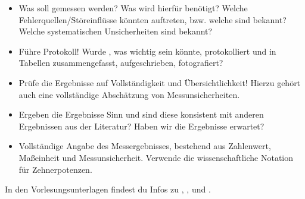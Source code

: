 \documentclass[letterpaper,10pt,english]{jupyterBook}
\begin{document}
\begin{itemize}
\item {} 
\sphinxAtStartPar
{} Was soll gemessen werden? Was wird hierfür benötigt? Welche Fehlerquellen/Störeinflüsse könnten auftreten, bzw. welche sind bekannt? Welche systematischen Unsicherheiten sind bekannt?

\item {} 
\sphinxAtStartPar
{} Führe Protokoll! Wurde , was wichtig sein könnte, protokolliert und in Tabellen zusammengefasst, aufgeschrieben, fotografiert?

\item {} 
\sphinxAtStartPar
{} Prüfe die Ergebnisse auf Vollständigkeit und Übersichtlichkeit! Hierzu gehört auch eine vollständige Abschätzung von Messunsicherheiten.

\item {} 
\sphinxAtStartPar
{} Ergeben die Ergebnisse Sinn und sind diese konsistent mit anderen Ergebnissen aus der Literatur? Haben wir die Ergebnisse erwartet?

\item {} 
\sphinxAtStartPar
{} Vollständige Angabe des Messergebnisses, bestehend aus Zahlenwert, Maßeinheit und Messunsicherheit. Verwende die wissenschaftliche Notation für Zehnerpotenzen.

\end{itemize}


\nopagebreak


\sphinxAtStartPar
In den Vorlesungsunterlagen findest du Infos zu {\hyperref[\detokenize{content/1_Messen_Einheit::doc}]{}}, {\hyperref[\detokenize{content/1_Messunsicherheiten::doc}]{}}, {\hyperref[\detokenize{content/1_Mittelwert_StdAbw::doc}]{}} und {\hyperref[\detokenize{content/1_Fehlerfortpflanzung::doc}]{}}.
\end{document}
